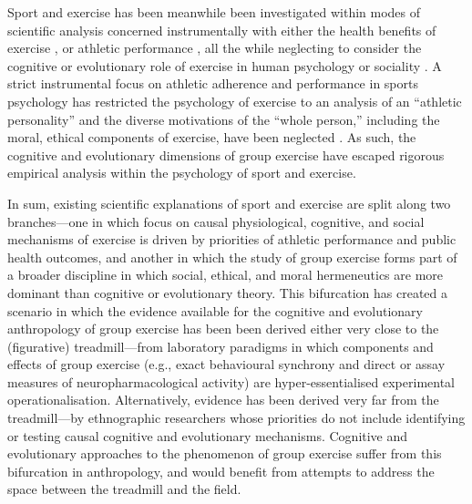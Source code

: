 Sport and exercise has been meanwhile been investigated within modes of scientific analysis concerned instrumentally with either the health benefits of exercise \citep{Fiuza-Luces2013,Morris1994}, or athletic performance \citep{Beedie2015}, all the while neglecting to consider the cognitive or evolutionary role of exercise in human psychology or sociality \citep{Balish2013,Coulter2015}. A strict instrumental focus on athletic adherence and performance in sports psychology has restricted the psychology of exercise to an analysis of an ``athletic personality'' and the diverse motivations of the ``whole person,'' including the moral, ethical components of exercise, have been neglected \citep{Coulter2015,Laborde2014}.  As such, the cognitive and evolutionary dimensions of group exercise have escaped rigorous empirical analysis within the psychology of sport and exercise.

In sum, existing scientific explanations of sport and exercise are split along two branches---one in which focus on causal physiological, cognitive, and social mechanisms of exercise is driven by priorities of athletic performance and public health outcomes, and another in which the study of group exercise forms part of a broader discipline in which social, ethical, and moral hermeneutics are more dominant than cognitive or evolutionary theory.  This bifurcation has created a scenario in which the evidence available for the cognitive and evolutionary anthropology of group exercise has been been derived either very close to the (figurative) treadmill---from laboratory paradigms in which components and effects of group exercise (e.g., exact behavioural synchrony and direct or assay measures of neuropharmacological activity) are hyper-essentialised experimental operationalisation.  Alternatively, evidence has been derived very far from the treadmill---by ethnographic researchers whose priorities do not include identifying or testing causal cognitive and evolutionary mechanisms.  Cognitive and evolutionary approaches to the phenomenon of group exercise suffer from this bifurcation in anthropology, and would benefit from attempts to address the space between the treadmill and the field.
